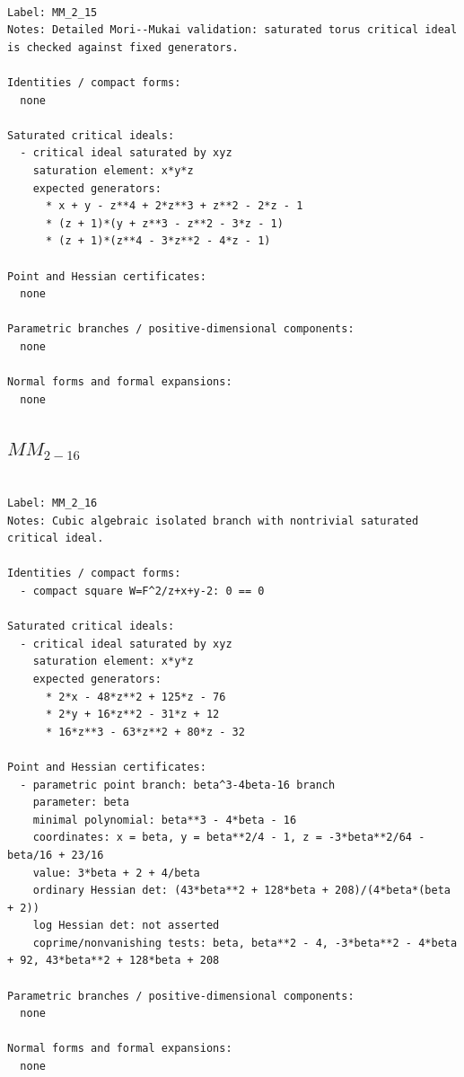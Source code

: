 \documentclass[10pt,a4paper]{article}
\begin{document}
\begin{lstlisting}

Label: MM_2_15
Notes: Detailed Mori--Mukai validation: saturated torus critical ideal is checked against fixed generators.

Identities / compact forms:
  none

Saturated critical ideals:
  - critical ideal saturated by xyz
    saturation element: x*y*z
    expected generators:
      * x + y - z**4 + 2*z**3 + z**2 - 2*z - 1
      * (z + 1)*(y + z**3 - z**2 - 3*z - 1)
      * (z + 1)*(z**4 - 3*z**2 - 4*z - 1)

Point and Hessian certificates:
  none

Parametric branches / positive-dimensional components:
  none

Normal forms and formal expansions:
  none

\end{lstlisting}

\subsection*{$ MM_{2-16} $}

\begin{lstlisting}

Label: MM_2_16
Notes: Cubic algebraic isolated branch with nontrivial saturated critical ideal.

Identities / compact forms:
  - compact square W=F^2/z+x+y-2: 0 == 0

Saturated critical ideals:
  - critical ideal saturated by xyz
    saturation element: x*y*z
    expected generators:
      * 2*x - 48*z**2 + 125*z - 76
      * 2*y + 16*z**2 - 31*z + 12
      * 16*z**3 - 63*z**2 + 80*z - 32

Point and Hessian certificates:
  - parametric point branch: beta^3-4beta-16 branch
    parameter: beta
    minimal polynomial: beta**3 - 4*beta - 16
    coordinates: x = beta, y = beta**2/4 - 1, z = -3*beta**2/64 - beta/16 + 23/16
    value: 3*beta + 2 + 4/beta
    ordinary Hessian det: (43*beta**2 + 128*beta + 208)/(4*beta*(beta + 2))
    log Hessian det: not asserted
    coprime/nonvanishing tests: beta, beta**2 - 4, -3*beta**2 - 4*beta + 92, 43*beta**2 + 128*beta + 208

Parametric branches / positive-dimensional components:
  none

Normal forms and formal expansions:
  none

\end{lstlisting}
\end{document}
